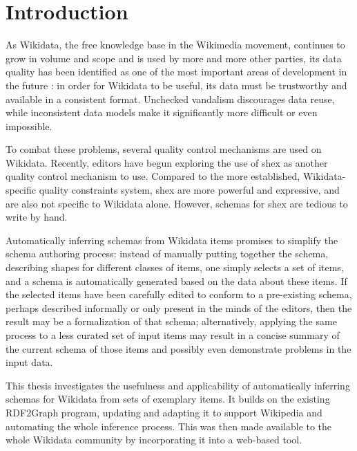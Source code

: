 
\chapter{Introduction}
\label{ch:Introduction}

As Wikidata,
the free knowledge base in the Wikimedia movement,
continues to grow in volume and scope and is used by more and more other parties, %
its data quality has been identified as one of the most important areas of development in the future \cite{wdcon2017-sotp}: %
in order for Wikidata to be useful,
its data must be trustworthy and available in a consistent format.
Unchecked vandalism discourages data reuse,
while inconsistent data models make it significantly more difficult or even impossible.

To combat these problems,
several quality control mechanisms are used on Wikidata.
Recently, editors have begun exploring the use of \acrlong{shex}
as another quality control mechanism to use.
Compared to the more established, Wikidata-specific quality constraints system,
\acrlong{shex} are more powerful and expressive,
and are also not specific to Wikidata alone.
However, schemas for \acrlong{shex} are tedious to write by hand.

Automatically inferring schemas from Wikidata items
promises to simplify the schema authoring process:
instead of manually putting together the schema,
describing shapes for different classes of items,
one simply selects a set of items,
and a schema is automatically generated based on the data about these items.
If the selected items have been carefully edited
to conform to a pre-existing schema,
perhaps described informally or only present in the minds of the editors,
then the result may be a formalization of that schema;
alternatively, applying the same process to a less curated set of input items
may result in a concise summary of the current schema of those items %
and possibly even demonstrate problems in the input data.


This thesis investigates the usefulness and applicability
of automatically inferring schemas for Wikidata from sets of exemplary items.
It builds on the existing RDF2Graph \cite{vanDam2015} program,
updating and adapting it to support Wikipedia
and automating the whole inference process.
This was then made available to the whole Wikidata community %
by incorporating it into a web-based tool.

